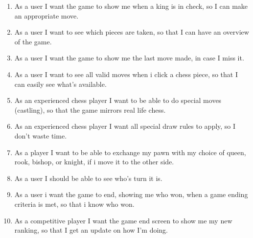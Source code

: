 \documentclass{article}
\begin{document}
\begin{enumerate}
\item	As a user I want the game to show me when a king is in check, so I can make an appropriate move.

\item	As a user I want to see which pieces are taken, so that I can have an overview of the game.

\item	As a user I want the game to show me the last move made, in case I miss it.

\item 	As a user I want to see all valid moves when i click a chess piece, so that I can easily see what's available.   

\item 	As an experienced chess player I want to be able to do special moves (castling), so that the game mirrors real life chess.

\item	As an experienced chess player I want all special draw rules to apply, so I don't waste time. 

\item	As a player I want to be able to exchange my pawn with my choice of queen, rook, bishop, or knight, if i move it to the other side. 

\item	As a user I should be able to see who's turn it is.

\item	As a user i want the game to end, showing me who won, when a game ending criteria is met, so that i know who won.

\item	As a competitive player I want the game end screen to show me my new ranking, so that I get an update on how I'm doing.

\end{enumerate}
\end{document}
